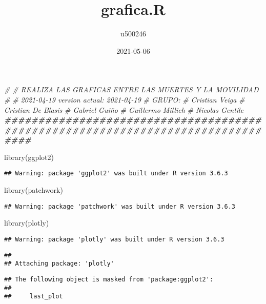 \documentclass[
]{article}
\title{grafica.R}
\author{u500246}
\date{2021-05-06}
\newenvironment{Shaded}{\begin{snugshade}}{\end{snugshade}}
\newcommand{\CommentTok}[1]{\textcolor[rgb]{0.56,0.35,0.01}{\textit{#1}}}
\newcommand{\DocumentationTok}[1]{\textcolor[rgb]{0.56,0.35,0.01}{\textbf{\textit{#1}}}}
\newcommand{\FunctionTok}[1]{\textcolor[rgb]{0.00,0.00,0.00}{#1}}
\newcommand{\NormalTok}[1]{#1}
\begin{document}
\maketitle

\begin{Shaded}
\begin{Highlighting}[]
\CommentTok{\#}
\CommentTok{\# REALIZA LAS GRAFICAS ENTRE LAS MUERTES Y LA MOVILIDAD}
\CommentTok{\#}
\CommentTok{\# 2021{-}04{-}19  version actual:   2021{-}04{-}19 }
\CommentTok{\# GRUPO:  }
\CommentTok{\#       Cristian Veiga}
\CommentTok{\#       Cristian De Blasis}
\CommentTok{\#       Gabriel Guiño}
\CommentTok{\#       Guillermo Millich}
\CommentTok{\#       Nicolas Gentile}
\DocumentationTok{\#\#\#\#\#\#\#\#\#\#\#\#\#\#\#\#\#\#\#\#\#\#\#\#\#\#\#\#\#\#\#\#\#\#\#\#\#\#\#\#\#\#\#\#\#\#\#\#\#\#\#\#\#\#\#\#\#\#\#\#\#\#\#\#\#\#\#\#\#\#\#\#\#\#\#\#\#\#\#\#}

\FunctionTok{library}\NormalTok{(ggplot2)}
\end{Highlighting}
\end{Shaded}

\begin{verbatim}
## Warning: package 'ggplot2' was built under R version 3.6.3
\end{verbatim}

\begin{Shaded}
\begin{Highlighting}[]
\FunctionTok{library}\NormalTok{(patchwork)}
\end{Highlighting}
\end{Shaded}

\begin{verbatim}
## Warning: package 'patchwork' was built under R version 3.6.3
\end{verbatim}

\begin{Shaded}
\begin{Highlighting}[]
\FunctionTok{library}\NormalTok{(plotly)}
\end{Highlighting}
\end{Shaded}

\begin{verbatim}
## Warning: package 'plotly' was built under R version 3.6.3
\end{verbatim}

\begin{verbatim}
## 
## Attaching package: 'plotly'
\end{verbatim}

\begin{verbatim}
## The following object is masked from 'package:ggplot2':
## 
##     last_plot
\end{verbatim}
\end{document}
